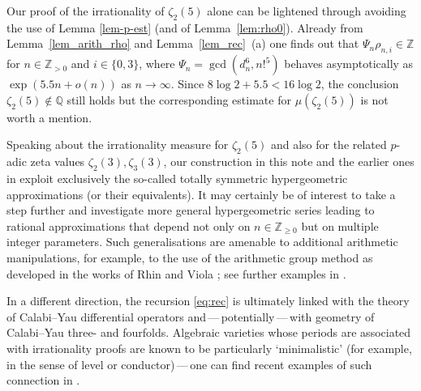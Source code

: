 \documentclass[12pt]{article}
\let\ge\geqslant
\theoremstyle{remark}
\numberwithin{equation}{section}
\begin{document}
Our proof of the irrationality of $\zeta_2(5)$ alone can be lightened through avoiding the use of Lemma \ref{lem-p-est} (and of Lemma~\ref{lem:rho0}).
Already from Lemma~\ref{lem_arith_rho} and Lemma~\ref{lem_rec}~(a) one finds out that $\Psi_n\rho_{n,i}\in\mathbb Z$ for $n\in\mathbb Z_{>0}$ and $i\in\{0,3\}$, where $\Psi_n=\gcd(d_n^6,n!^5)$ behaves asymptotically as $\exp(5.5n+o(n))$ as $n\to\infty$.
Since $8\log 2 + 5.5 < 16\log 2$, the conclusion $\zeta_2(5)\notin\mathbb Q$ still holds but the corresponding estimate for $\mu(\zeta_2(5))$ is not worth a mention.

Speaking about the irrationality measure for $\zeta_2(5)$ and also for the related $p$-adic zeta values $\zeta_2(3),\zeta_3(3)$, our construction in this note and the earlier ones in \cite{Beu2008,Cal2005,Lai2025} exploit exclusively the so-called totally symmetric hypergeometric approximations (or their equivalents).
It may certainly be of interest to take a step further and investigate more general hypergeometric series leading to rational approximations that depend not only on $n\in\mathbb Z_{\ge0}$ but on multiple integer parameters.
Such generalisations are amenable to additional arithmetic manipulations, for example, to the use of the arithmetic group method as developed in the works of Rhin and Viola \cite{RV2001}; see further examples in \cite{BZ2022+,MZ2020}.

In a different direction, the recursion \eqref{eq:rec} is ultimately linked with the theory of Calabi--Yau differential operators \cite{AZ2006,vSt2018} and\,---\,potentially\,---\,with geometry of Calabi--Yau three- and fourfolds. Algebraic varieties whose periods are associated with irrationality proofs are known to be particularly `minimalistic' (for example, in the sense of level or conductor)\,---\,one can find recent examples of such connection in \cite{vSt2021}.
\end{document}
